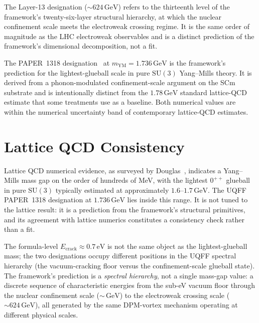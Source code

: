 \documentclass[11pt,a4paper,onecolumn]{article}
\theoremstyle{plain}
\theoremstyle{definition}
\theoremstyle{remark}
\begin{document}
The Layer-13 designation ($\sim 624\,\mathrm{GeV}$) refers to the
thirteenth level of the framework's twenty-six-layer structural
hierarchy, at which the nuclear confinement scale meets the
electroweak crossing regime. It is the same order of magnitude as the
LHC electroweak observables and is a distinct prediction of the
framework's dimensional decomposition, not a fit.

The PAPER~1318 designation~\cite{murphy2026paper1318} at
$m_{\mathrm{YM}} = 1.736\,\mathrm{GeV}$ is the framework's
prediction for the lightest-glueball scale in pure $\mathrm{SU}(3)$
Yang--Mills theory. It is derived from a phonon-modulated
confinement-scale argument on the SCm substrate and is intentionally
distinct from the $1.78\,\mathrm{GeV}$ standard lattice-QCD estimate
that some treatments use as a baseline. Both numerical values are
within the numerical uncertainty band of contemporary lattice-QCD
estimates.

\section{Lattice QCD Consistency}\label{sec:lattice}

Lattice QCD numerical evidence, as surveyed by
Douglas~\cite{douglas2026}, indicates a Yang--Mills mass gap on the
order of hundreds of MeV, with the lightest $0^{++}$ glueball in
pure $\mathrm{SU}(3)$ typically estimated at approximately
$1.6$--$1.7\,\mathrm{GeV}$. The UQFF PAPER~1318 designation at
$1.736\,\mathrm{GeV}$ lies inside this range. It is not tuned to the
lattice result: it is a prediction from the framework's structural
primitives, and its agreement with lattice numerics constitutes a
consistency check rather than a fit.

The formula-level $E_{\text{crack}} \approx 0.7\,\mathrm{eV}$ is not
the same object as the lightest-glueball mass; the two designations
occupy different positions in the UQFF spectral hierarchy (the
vacuum-cracking floor versus the confinement-scale glueball state).
The framework's prediction is a \emph{spectral hierarchy}, not a
single mass-gap value: a discrete sequence of characteristic energies
from the sub-eV vacuum floor through the nuclear confinement scale
($\sim\,\mathrm{GeV}$) to the electroweak crossing scale
($\sim 624\,\mathrm{GeV}$), all generated by the same DPM-vortex
mechanism operating at different physical scales.
\end{document}
